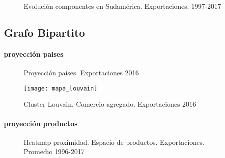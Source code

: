 \documentclass[class=article, crop=false]{standalone}
\begin{document}
\begin{figure}
	\centering
	\caption{Evolución componentes en Sudamérica. Exportaciones. 1997-2017}
	\label{fig:serie_componentes}
\end{figure}



\subsection{Grafo Bipartito}


\paragraph{proyección paises}

\begin{figure}
	\centering
	\caption{Proyección países. Exportaciones 2016}
	\label{fig:mapas_proyeccion}
\end{figure}




\begin{figure}
	\centering	
	\texttt{[image: mapa\_louvain]}
	\caption{Cluster Louvain. Comercio agregado. Exportaciones 2016}
	\label{fig:mapa_comercio_agregado}
\end{figure}


\paragraph{proyección productos}


\begin{figure}
	\centering
	\caption{Heatmap proximidad. Espacio de productos. Exportaciones. Promedio 1996-2017}
	\label{fig:proximity}
\end{figure}
\end{document}
